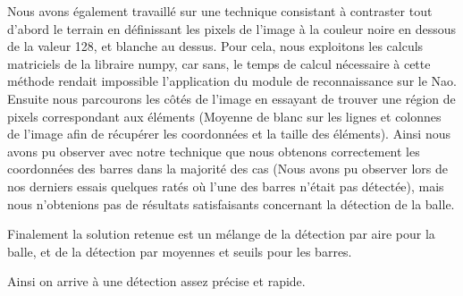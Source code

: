 \par Nous avons également travaillé sur une
technique consistant à contraster tout
d'abord le terrain en définissant les pixels de l'image à la couleur noire en
dessous de la valeur 128, et blanche au dessus. Pour cela, nous exploitons les calculs matriciels de la libraire numpy, car sans, le temps de calcul nécessaire à cette méthode rendait impossible l’application du module de reconnaissance sur le Nao. Ensuite nous parcourons les
côtés de l'image en essayant de trouver une région de pixels correspondant aux
éléments (Moyenne de blanc sur les lignes et colonnes de l'image afin de récupérer les
coordonnées et la taille des éléments). Ainsi nous avons pu observer avec notre
technique que nous obtenons correctement les coordonnées des barres dans la
majorité des cas (Nous avons pu observer lors de nos derniers essais quelques
ratés où l'une des barres n'était pas détectée), mais nous n'obtenions pas de
résultats satisfaisants concernant la détection de la balle.

\par Finalement la solution retenue est un mélange de la détection par aire pour
la balle, et de la détection par moyennes et seuils pour les barres.
\par Ainsi on arrive à une détection assez précise et rapide.
